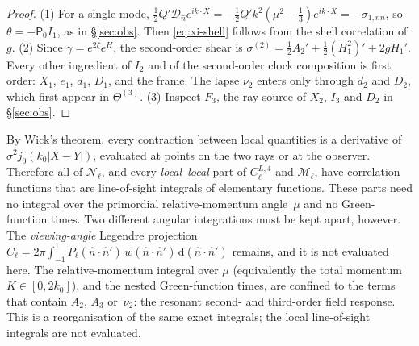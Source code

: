 \documentclass[11pt]{article}
\theoremstyle{definition}
\theoremstyle{remark}
\newcommand{\nh}{\hat n}
\newcommand{\dd}{\mathrm{d}}
\begin{document}
\begin{proof}
(1) For a single mode, $\frac12Q'\mathcal D_{\nh}e^{ik\cdot X}=-\frac12Q'k^2(\mu^2-\frac13)e^{ik\cdot X}=-\sigma_{1,nn}$,
so $\theta=-\mathsf P_0I_1$, as in \S\ref{sec:obs}. Then \eqref{eq:xi-shell} follows from the
shell correlation of~$g$. (2) Since $\gamma=e^{2\zeta}e^H$, the second-order shear is
$\sigma^{(2)}=\frac12A_2'+\frac12(H_1^2)'+2gH_1'$. Every other ingredient of $I_2$ and of the
second-order clock composition is first order: $X_1$, $e_1$, $d_1$, $D_1$, and the frame.
The lapse $\nu_2$ enters only through $d_2$ and $D_2$, which first appear in $\Theta^{(3)}$.
(3) Inspect $F_3$, the ray source of $X_2$, $I_3$ and $D_2$ in \S\ref{sec:obs}.
\end{proof}

By Wick's theorem, every contraction between local quantities is a derivative of
$\sigma^2j_0(k_0|X-Y|)$, evaluated at points on the two rays or at the observer. Therefore all
of $\mathcal N_\ell$, and every \emph{local--local} part of $C^{L,4}_\ell$ and
$\mathcal M_\ell$, have correlation functions that are line-of-sight integrals of elementary
functions. These parts need no integral over the primordial relative-momentum angle~$\mu$ and
no Green-function times. Two different angular integrations must be kept apart, however. The
\emph{viewing-angle} Legendre projection
$C_\ell=2\pi\int_{-1}^1P_\ell(\nh\cdot\nh')\,w(\nh\cdot\nh')\,\dd(\nh\cdot\nh')$ remains, and it
is not evaluated here. The relative-momentum integral over $\mu$ (equivalently the total
momentum $K\in[0,2k_0]$), and the nested Green-function times, are confined to the terms that
contain $A_2$, $A_3$ or~$\nu_2$: the resonant second- and third-order field response. This is a
reorganisation of the same exact integrals; the local line-of-sight integrals are not
evaluated.
\end{document}
